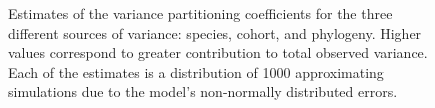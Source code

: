 \documentclass{nature}
\begin{document}
\begin{figure}[ht]
  \caption{Estimates of the variance partitioning coefficients for the three different sources of variance: species, cohort, and phylogeny. Higher values correspond to greater contribution to total observed variance. Each of the estimates is a distribution of 1000 approximating simulations due to the model's non-normally distributed errors.}
  \label{fig:vpc}
\end{figure}
\end{document}
